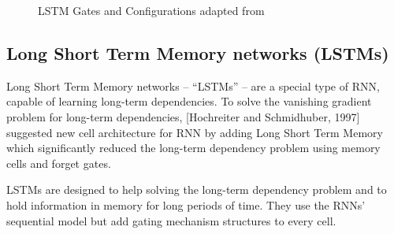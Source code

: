 \begin{figure}[!t]
 \centering
\caption{LSTM Gates and Configurations adapted from~\cite{colah}}
\end{figure}%

\subsection{Long Short Term Memory networks (LSTMs)}\label{Sec:LSTM}


Long Short Term Memory networks – “LSTMs” – are a special type of RNN, capable of learning long-term dependencies. To solve the vanishing gradient problem for long-term dependencies, [Hochreiter and Schmidhuber, 1997]~\cite{Hochreiter} suggested new cell architecture for RNN by adding Long Short Term Memory which significantly reduced the long-term dependency problem using memory cells and forget gates.

LSTMs are designed to help solving the long-term dependency problem and to hold information in memory for long periods of time. They use the RNNs’ sequential model but add gating mechanism structures to every cell.


